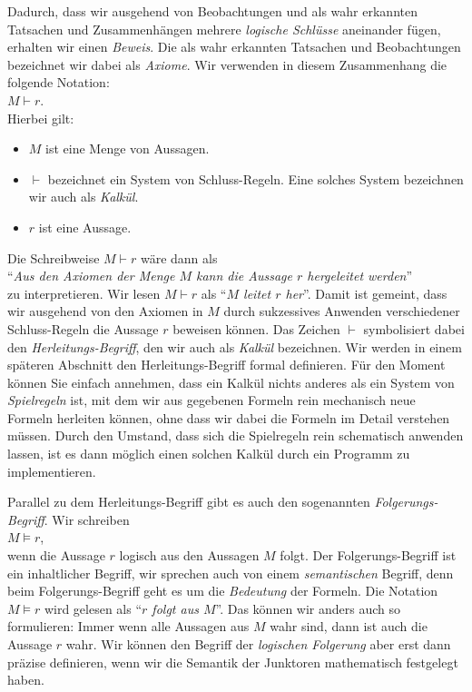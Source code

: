 Dadurch, dass wir ausgehend von Beobachtungen und als wahr erkannten Tatsachen und Zusammenh\"{a}ngen
mehrere \emph{\color{blue}logische Schl\"{u}sse} aneinander f\"{u}gen, erhalten wir einen \emph{\color{blue}Beweis}. 
Die als wahr erkannten Tatsachen und Beobachtungen bezeichnet wir dabei als \emph{\color{blue}Axiome}.
Wir verwenden in diesem Zusammenhang die folgende  Notation: \\[0.2cm]
\hspace*{1.3cm} $M \vdash r$. \\[0.2cm]
Hierbei gilt:
\begin{itemize}
\item $M$ ist eine Menge von Aussagen.
\item $\vdash$ bezeichnet ein System von Schluss-Regeln.  Eine solches System bezeichnen wir auch als \emph{\color{blue}Kalk\"{u}l}.
\item $r$ ist eine Aussage.  
\end{itemize}
Die Schreibweise $M \vdash r$ w\"{a}re dann als \\[0.2cm]
\hspace*{1.3cm} ``\emph{\color{blue}Aus den Axiomen der Menge $M$ kann die Aussage $r$ hergeleitet werden}'' \\[0.2cm]
zu interpretieren.  Wir lesen  $M \vdash r$ als ``\emph{\color{blue}$M$ leitet $r$ her}''.
Damit ist gemeint, dass wir ausgehend von den Axiomen in $M$ durch sukzessives
Anwenden verschiedener Schluss-Regeln die Aussage $r$ beweisen k\"{o}nnen.
Das Zeichen $\vdash$  symbolisiert dabei den \emph{\color{blue}Herleitungs-Begriff}, den wir auch
als \emph{\color{blue}Kalk\"{u}l} bezeichnen.   
Wir werden in einem sp\"{a}teren Abschnitt den Herleitungs-Begriff formal definieren.
F\"ur den Moment k\"onnen Sie einfach annehmen, dass ein Kalk\"ul nichts anderes als ein System von
\emph{\color{blue}Spielregeln} ist, mit dem wir aus gegebenen Formeln rein mechanisch neue Formeln herleiten
k\"onnen, ohne dass wir dabei die Formeln im Detail verstehen m\"ussen.  Durch den Umstand, dass
sich die Spielregeln rein schematisch anwenden lassen, ist es dann m\"oglich einen solchen Kalk\"ul 
durch ein Programm zu implementieren.

Parallel zu dem Herleitungs-Begriff gibt es auch den sogenannten \emph{\color{blue}Folgerungs-Begriff}.
Wir schreiben 
\\[0.2cm]
\hspace*{1.3cm}
 $M \models r$, 
\\[0.2cm]
wenn die Aussage $r$ logisch aus den Aussagen $M$ folgt.  Der Folgerungs-Begriff ist ein
inhaltlicher Begriff, wir sprechen auch von einem \emph{\color{blue}semantischen} Begriff,
denn beim Folgerungs-Begriff geht es um die \emph{\color{blue}Bedeutung} der Formeln.
Die Notation $M \models r$ wird gelesen als ``\emph{\color{blue}$r$ folgt aus $M$}''.
Das k\"{o}nnen wir anders auch so
formulieren:  Immer wenn alle Aussagen aus $M$ wahr sind, dann ist auch die Aussage $r$ wahr.
Wir k\"{o}nnen den Begriff der \emph{\color{blue}logischen Folgerung} aber
erst dann pr\"{a}zise definieren, wenn wir die Semantik der Junktoren mathematisch festgelegt haben.


